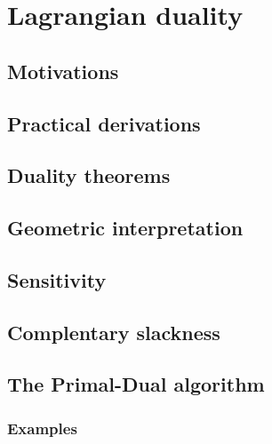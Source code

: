 \chapter{Lagrangian duality}

\section{Motivations}

\section{Practical derivations}

\section{Duality theorems}

\section{Geometric interpretation}

\section{Sensitivity}

\section{Complentary slackness}

\section{The Primal-Dual algorithm}

\subsection{Examples}
